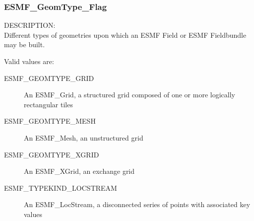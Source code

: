 \subsubsection{ESMF\_GeomType\_Flag}
\label{opt:geomtype}

{\sf DESCRIPTION:\\}
Different types of geometries upon which an ESMF Field or ESMF Fieldbundle may
be built. 

Valid values are:
\begin{description}
\item [ESMF\_GEOMTYPE\_GRID]
      An ESMF\_Grid, a structured grid composed of one or more logically rectangular tiles
\item [ESMF\_GEOMTYPE\_MESH]
      An ESMF\_Mesh, an unstructured grid
\item [ESMF\_GEOMTYPE\_XGRID]
      An ESMF\_XGrid, an exchange grid
\item [ESMF\_TYPEKIND\_LOCSTREAM]
      An ESMF\_LocStream, a disconnected series of points with associated key values
\end{description}




